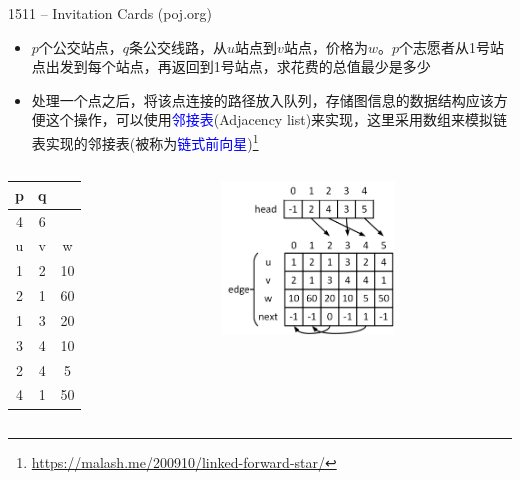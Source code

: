 \begin{frame}{1511 -- Invitation Cards (poj.org)}
    \begin{itemize}
        \item $p$个公交站点，$q$条公交线路，从$u$站点到$v$站点，价格为$w$。$p$个志愿者从1号站点出发到每个站点，再返回到1号站点，求花费的总值最少是多少
        \item 处理一个点之后，将该点连接的路径放入队列，存储图信息的数据结构应该方便这个操作，可以使用\textcolor{blue}{邻接表}(Adjacency list)来实现，这里采用数组来模拟链表实现的邻接表(被称为\textcolor{blue}{链式前向星})\footnote{\url{https://malash.me/200910/linked-forward-star/}}
\end{itemize}
\begin{columns}   
        \begin{table}
            \scriptsize{
            \begin{tabular}{ccc}
                p  & q    \\\hline
                4  & 6    \\\hline
                u  & v  &  w   \\\hline
                1  & 2  & 10   \\\hline
                2  & 1  & 60   \\\hline
                1  & 3  & 20   \\\hline
                3  & 4  & 10   \\\hline
                2  & 4  & 5    \\\hline
                4  & 1  & 50   \\\hline
            \end{tabular}
            }
        \end{table}
        \includegraphics[width=0.6\textwidth]{fig/8-4.png}
\end{columns}
\end{frame}
